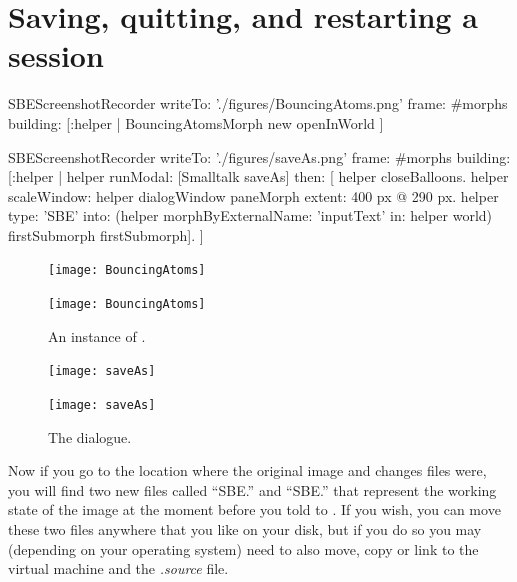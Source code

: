 \documentclass[a4paper,10pt,twoside]{book}
\begin{document}
\section{Saving, quitting, and restarting a \sq session}


\begin{ExecuteSmalltalkScript}
SBEScreenshotRecorder writeTo: './figures/BouncingAtoms.png' frame: #morphs building: [:helper |
  BouncingAtomsMorph new openInWorld
]
\end{ExecuteSmalltalkScript}

\begin{ExecuteSmalltalkScript}
SBEScreenshotRecorder writeTo: './figures/saveAs.png' frame: #morphs building: [:helper |
	helper
		runModal: [Smalltalk saveAs]
		then: [
			helper closeBalloons.
			helper scaleWindow: helper dialogWindow paneMorph extent: 400 px @ 290 px.
			helper type: 'SBE' into: (helper morphByExternalName: 'inputText' in: helper world) firstSubmorph firstSubmorph].
]
\end{ExecuteSmalltalkScript}

\begin{figure}[htb]
\begin{minipage}[b]{.48\textwidth}
\ifluluelse
	{\centerline {\texttt{[image: BouncingAtoms]}}}
	{\centerline {\texttt{[image: BouncingAtoms]}}}
	\caption{An instance of .
	\label{fig:bouncingAtoms}}
\end{minipage}
\hfill
\begin{minipage}[b]{.48\textwidth}
\ifluluelse
	{\centerline{\texttt{[image: saveAs]}}}
	{\centerline{\texttt{[image: saveAs]}}}
	\caption{The  dialogue.
	\label{fig:saveas}}
\end{minipage}
\end{figure}


Now if you go to the location where the original image and changes files were, you will find two new files called ``SBE.'' and ``SBE.'' that represent the working state of the \sq image at the moment before you told \sq to .
If you wish, you can move these two files anywhere that you like on your disk, but if you do so you may (depending on your operating system) need to also move, copy or link to the virtual machine and the \emph{.source} file.
\end{document}
